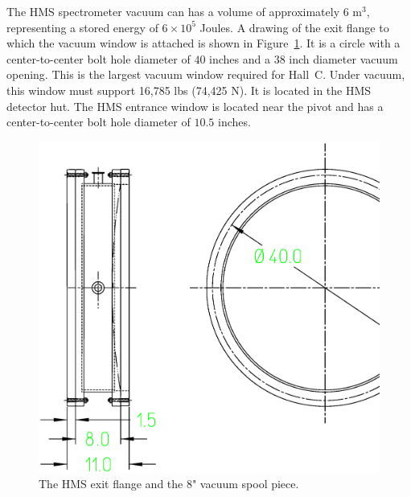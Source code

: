The HMS spectrometer vacuum can has a volume
of approximately $6$ m$^3$, representing a stored energy of $6 \times 10^5$
Joules. A drawing of the exit flange to which the vacuum
window is attached is shown in Figure~\ref{fig:hms_flange}.  It is a
circle with a center-to-center bolt hole diameter of $40$ inches
and a $38$ inch diameter vacuum opening. This is the largest vacuum window
required for Hall~C.
Under vacuum, this window must support 16,785
lbs (74,425 N). It is located in the HMS detector hut. The HMS
entrance window is located near the pivot and has a center-to-center
bolt hole diameter of $10.5$ inches.

\begin{figure}
\includegraphics[width=6in]{figHMSflange}
\caption{The HMS exit flange and the 8" vacuum spool piece. \label{fig:hms_flange}}
\end{figure}

